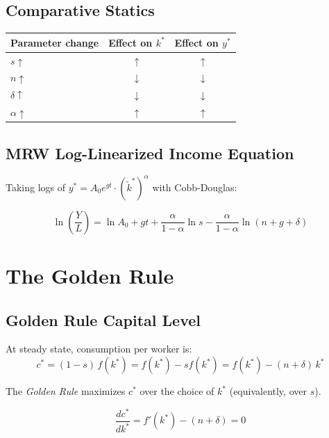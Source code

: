\documentclass[a4paper,11pt]{article}
\newcommand{\ktilde}{\tilde{k}}
\begin{document}
\subsection*{Comparative Statics}

\begin{center}
\begin{tabular}{lcc}
\toprule
Parameter change & Effect on $k^*$ & Effect on $y^*$ \\
\midrule
$s \uparrow$ & $\uparrow$ & $\uparrow$ \\
$n \uparrow$ & $\downarrow$ & $\downarrow$ \\
$\delta \uparrow$ & $\downarrow$ & $\downarrow$ \\
$\alpha \uparrow$ & $\uparrow$ & $\uparrow$ \\
\bottomrule
\end{tabular}
\end{center}

\subsection*{MRW Log-Linearized Income Equation}

Taking logs of $y^* = A_0 e^{gt} \cdot (\ktilde^*)^\alpha$ with Cobb-Douglas:

\begin{keyformulabox}
\[
\ln\!\left(\frac{Y}{L}\right) = \ln A_0 + gt + \frac{\alpha}{1-\alpha}\ln s - \frac{\alpha}{1-\alpha}\ln(n+g+\delta)
\]
\end{keyformulabox}

\section{The Golden Rule}

\subsection*{Golden Rule Capital Level}

At steady state, consumption per worker is:
\[
c^* = (1-s)\,f(k^*) = f(k^*) - sf(k^*) = f(k^*) - (n+\delta)\,k^*
\]

The \emph{Golden Rule} maximizes $c^*$ over the choice of $k^*$ (equivalently, over $s$).

\begin{derivationbox}
\[
\frac{dc^*}{dk^*} = f'(k^*) - (n+\delta) = 0
\]
\end{derivationbox}
\end{document}
